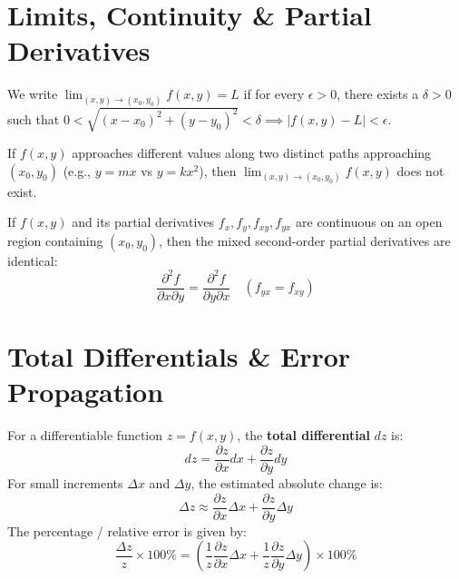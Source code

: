 \section{Limits, Continuity \& Partial Derivatives}

\begin{definition}
We write $\lim_{(x,y)\to (x_0,y_0)} f(x,y) = L$ if for every $\epsilon > 0$, there exists a $\delta > 0$ such that $0 < \sqrt{(x-x_0)^2 + (y-y_0)^2} < \delta \implies |f(x,y) - L| < \epsilon$.
\end{definition}

\begin{theorem}
If $f(x,y)$ approaches different values along two distinct paths approaching $(x_0,y_0)$ (e.g., $y = mx$ vs $y = kx^2$), then $\lim_{(x,y)\to (x_0,y_0)} f(x,y)$ does not exist.
\end{theorem}

\begin{theorem}
If $f(x,y)$ and its partial derivatives $f_x, f_y, f_{xy}, f_{yx}$ are continuous on an open region containing $(x_0,y_0)$, then the mixed second-order partial derivatives are identical:
\begin{equation}
\frac{\partial^2 f}{\partial x \partial y} = \frac{\partial^2 f}{\partial y \partial x} \quad (f_{yx} = f_{xy})
\end{equation}
\end{theorem}

\section{Total Differentials \& Error Propagation}

\begin{definition}
For a differentiable function $z = f(x,y)$, the \textbf{total differential} $dz$ is:
\begin{equation}
dz = \frac{\partial z}{\partial x} dx + \frac{\partial z}{\partial y} dy
\end{equation}
For small increments $\Delta x$ and $\Delta y$, the estimated absolute change is:
\begin{equation}
\Delta z \approx \frac{\partial z}{\partial x} \Delta x + \frac{\partial z}{\partial y} \Delta y
\end{equation}
The percentage / relative error is given by:
\begin{equation}
\frac{\Delta z}{z} \times 100\% = \left( \frac{1}{z} \frac{\partial z}{\partial x} \Delta x + \frac{1}{z} \frac{\partial z}{\partial y} \Delta y \right) \times 100\%
\end{equation}
\end{definition}

